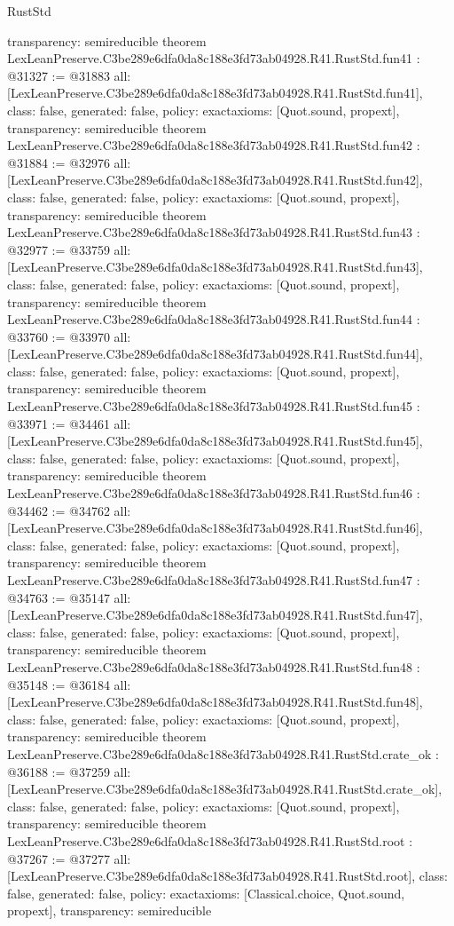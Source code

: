 \begin{lexlean}{RustStd}
\begin{coremodule}
{  transparency: semireducible
}
theorem LexLeanPreserve.C3be289e6dfa0da8c188e3fd73ab04928.R41.RustStd.fun41 : @31327 := @31883 {
  all: [LexLeanPreserve.C3be289e6dfa0da8c188e3fd73ab04928.R41.RustStd.fun41],
  class: false,
  generated: false,
  policy: exact{axioms: [Quot.sound, propext]},
  transparency: semireducible
}
theorem LexLeanPreserve.C3be289e6dfa0da8c188e3fd73ab04928.R41.RustStd.fun42 : @31884 := @32976 {
  all: [LexLeanPreserve.C3be289e6dfa0da8c188e3fd73ab04928.R41.RustStd.fun42],
  class: false,
  generated: false,
  policy: exact{axioms: [Quot.sound, propext]},
  transparency: semireducible
}
theorem LexLeanPreserve.C3be289e6dfa0da8c188e3fd73ab04928.R41.RustStd.fun43 : @32977 := @33759 {
  all: [LexLeanPreserve.C3be289e6dfa0da8c188e3fd73ab04928.R41.RustStd.fun43],
  class: false,
  generated: false,
  policy: exact{axioms: [Quot.sound, propext]},
  transparency: semireducible
}
theorem LexLeanPreserve.C3be289e6dfa0da8c188e3fd73ab04928.R41.RustStd.fun44 : @33760 := @33970 {
  all: [LexLeanPreserve.C3be289e6dfa0da8c188e3fd73ab04928.R41.RustStd.fun44],
  class: false,
  generated: false,
  policy: exact{axioms: [Quot.sound, propext]},
  transparency: semireducible
}
theorem LexLeanPreserve.C3be289e6dfa0da8c188e3fd73ab04928.R41.RustStd.fun45 : @33971 := @34461 {
  all: [LexLeanPreserve.C3be289e6dfa0da8c188e3fd73ab04928.R41.RustStd.fun45],
  class: false,
  generated: false,
  policy: exact{axioms: [Quot.sound, propext]},
  transparency: semireducible
}
theorem LexLeanPreserve.C3be289e6dfa0da8c188e3fd73ab04928.R41.RustStd.fun46 : @34462 := @34762 {
  all: [LexLeanPreserve.C3be289e6dfa0da8c188e3fd73ab04928.R41.RustStd.fun46],
  class: false,
  generated: false,
  policy: exact{axioms: [Quot.sound, propext]},
  transparency: semireducible
}
theorem LexLeanPreserve.C3be289e6dfa0da8c188e3fd73ab04928.R41.RustStd.fun47 : @34763 := @35147 {
  all: [LexLeanPreserve.C3be289e6dfa0da8c188e3fd73ab04928.R41.RustStd.fun47],
  class: false,
  generated: false,
  policy: exact{axioms: [Quot.sound, propext]},
  transparency: semireducible
}
theorem LexLeanPreserve.C3be289e6dfa0da8c188e3fd73ab04928.R41.RustStd.fun48 : @35148 := @36184 {
  all: [LexLeanPreserve.C3be289e6dfa0da8c188e3fd73ab04928.R41.RustStd.fun48],
  class: false,
  generated: false,
  policy: exact{axioms: [Quot.sound, propext]},
  transparency: semireducible
}
theorem LexLeanPreserve.C3be289e6dfa0da8c188e3fd73ab04928.R41.RustStd.crate_ok : @36188 := @37259 {
  all: [LexLeanPreserve.C3be289e6dfa0da8c188e3fd73ab04928.R41.RustStd.crate_ok],
  class: false,
  generated: false,
  policy: exact{axioms: [Quot.sound, propext]},
  transparency: semireducible
}
theorem LexLeanPreserve.C3be289e6dfa0da8c188e3fd73ab04928.R41.RustStd.root : @37267 := @37277 {
  all: [LexLeanPreserve.C3be289e6dfa0da8c188e3fd73ab04928.R41.RustStd.root],
  class: false,
  generated: false,
  policy: exact{axioms: [Classical.choice, Quot.sound, propext]},
  transparency: semireducible
}


\end{coremodule}
\end{lexlean}
